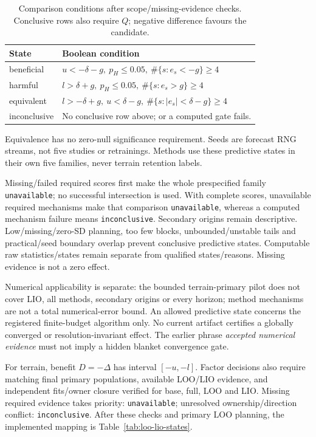 \begin{table}[htbp]
\centering\small
\caption{Comparison conditions after scope/missing-evidence checks.
Conclusive rows also require \(Q\); negative difference favours the candidate.}
\label{tab:comparison-conditions}\hypertarget{tab:comparison-conditions}{}
\begin{tabular}{lp{4.8in}}
\toprule
State & Boolean condition\\
\midrule
beneficial & \(u<-\delta-g,\ p_H\leq0.05,\ \#\{s:e_s<-g\}\geq4\)\\
harmful & \(l>\delta+g,\ p_H\leq0.05,\ \#\{s:e_s>g\}\geq4\)\\
equivalent & \(l>-\delta+g,\ u<\delta-g,\ \#\{s:|e_s|<\delta-g\}\geq4\)\\
inconclusive & No conclusive row above; or a computed gate fails.\\
\bottomrule
\end{tabular}
\end{table}

Equivalence has no zero-null significance requirement. Seeds are forecast
RNG streams, not five studies or retrainings. Methods use these predictive
states in their own five families, never terrain retention labels.

Missing/failed required scores first make the whole prespecified family
\texttt{unavailable}; no successful intersection is used. With complete
scores, unavailable required mechanisms make that comparison
\texttt{unavailable}, whereas a computed mechanism failure means
\texttt{inconclusive}. Secondary origins remain descriptive.
Low/missing/zero-SD planning, too few blocks, unbounded/unstable tails
and practical/seed boundary overlap prevent conclusive predictive states.
Computable raw statistics/states remain separate from qualified states/reasons.
Missing evidence is not a zero effect.

Numerical applicability is separate: the bounded terrain-primary pilot
does not cover LIO, all methods, secondary origins or every horizon;
method mechanisms are not a total numerical-error bound. An allowed predictive
state concerns the registered finite-budget algorithm only. No current artifact
certifies a globally converged or resolution-invariant effect. The earlier
phrase \emph{accepted numerical evidence} must not imply a hidden blanket
convergence gate.

For terrain, benefit \(D=-\Delta\) has interval \([-u,-l]\).
Factor decisions also require matching final primary populations, available
LOO/LIO evidence, and independent fits/owner closure verified for base,
full, LOO and LIO. Missing required evidence takes priority:
\texttt{unavailable}; unresolved ownership/direction conflict:
\texttt{inconclusive}. After these checks and primary LOO planning,
the implemented mapping is Table~\ref{tab:loo-lio-states}.


